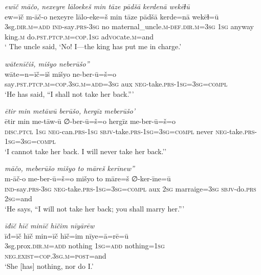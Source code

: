 \ea \label{ZP.107}
\textit{ewīč māčo, nexeyre lāloekeš min tāze pādšā kerdenā wekēɫū} \\ 
\gll ew=īč m-āč-o nexeyre lālo-eke=š min tāze pādšā kerde=nā wekēɫ=ū \\ 
 3sg\textsc{.dir}\textsc{.m}\textsc{=add} \textsc{ind-}say\textsc{.prs}\textsc{-3sg} no maternal\_uncle\textsc{.m}\textsc{-def}\textsc{.dir}\textsc{.m}\textsc{=3sg} \textsc{1sg} anyway king\textsc{.m} do\textsc{.pst}\textsc{.ptcp}\textsc{.m}\textsc{=cop}\textsc{.\textsc{1sg}} ad\textsc{voc}ate\textsc{.m}=and \\ 
\glt ` The uncle said, ‘No! I—the king has put me in charge.'
\z 
 
\ea \label{ZP.108}
\textit{wātenīčiš, mišyo neberūšo”} \\ 
\gll wāte=n=īč=iš mišyo ne-ber-ū=š=o \\ 
 say\textsc{.pst}\textsc{.ptcp}\textsc{.m}\textsc{=cop}\textsc{.3sg}\textsc{.m}\textsc{=add}\textsc{=3sg} aux \textsc{neg-}take\textsc{.prs}\textsc{-\textsc{1sg}}\textsc{=3sg}\textsc{=compl} \\ 
\glt `He has said, “I shall not take her back.”'
\z 
 
\ea \label{ZP.109}
\textit{ētir min metāwū berūšo, hergīz meberūšo’} \\ 
\gll ētir min me-tāw-ū ∅-ber-ū=š=o hergīz me-ber-ū=š=o \\ 
 \textsc{disc.ptcl} \textsc{1sg} \textsc{neg-}can\textsc{.prs}\textsc{-\textsc{1sg}} \textsc{sbjv-}take\textsc{.prs}\textsc{-\textsc{1sg}}\textsc{=3sg}\textsc{=compl} never \textsc{neg-}take\textsc{.prs}\textsc{-\textsc{1sg}}\textsc{=3sg}\textsc{=compl} \\ 
\glt `I cannot take her back. I will never take her back.’'
\z 
 
\ea \label{ZP.116}
\textit{māčo, meberūšo mišyo to māreš kerīnew”} \\ 
\gll m-āč-o me-ber-ū=š=o mišyo to māre=š ∅-ker-īne=ū \\ 
 \textsc{ind-}say\textsc{.prs}\textsc{-3sg} \textsc{neg-}take\textsc{.prs}\textsc{-\textsc{1sg}}\textsc{=3sg}\textsc{=compl} aux \textsc{2sg} marraige\textsc{=3sg} \textsc{sbjv-}do\textsc{.prs} \textsc{2sg}=and \\ 
\glt `He says, “I will not take her back; you shall marry her.”'
\z 
 
\ea \label{ZP.117}
\textit{īđīč hīč minīč hīčim nīyārēw} \\ 
\gll īđ=īč hīč min=īč hīč=im nīye=ā=rē=ū \\ 
 3sg.prox\textsc{.dir}\textsc{.m}\textsc{=add} nothing \textsc{1sg}\textsc{=add} nothing\textsc{=\textsc{1sg}} \textsc{\textsc{neg.}exist}\textsc{=cop}\textsc{.3sg}\textsc{.m}\textsc{=\textsc{post}}=and \\ 
\glt `She [has] nothing, nor do I.'
\z 
 
